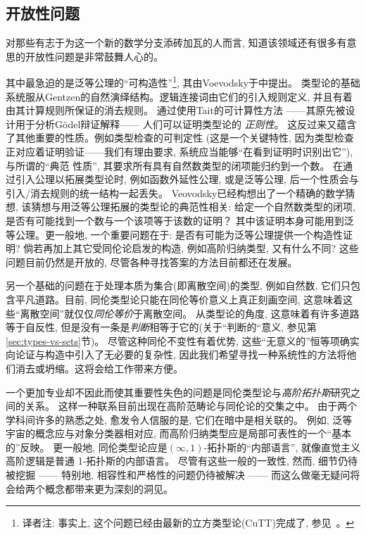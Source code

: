 %

\subsection*{开放性问题} 

%

对那些有志于为这一个新的数学分支添砖加瓦的人而言, 知道该领域还有很多有意思的开放性问题是非常鼓舞人心的。

%
其中最急迫的是泛等公理的``可构造性''\footnote{译者注: 事实上, 这个问题已经由最新的立方类型论(CuTT)完成了, 参见~\cite{cohen2016cubicaltypetheoryconstructive}。}, 
其由Voevodsky于\cite{Universe-poly}中提出。
类型论的基础系统服从Gentzen的自然演绎结构。逻辑连接词由它们的引入规则定义, 并且有着由其计算规则所保证的消去规则。
通过使用Tait的可计算性方法 ——其原先被设计用于分析G\"odel辩证解释—— 人们可以证明类型论的 \emph{正则性}。
这反过来又蕴含了其他重要的性质。例如类型检查的可判定性 
(这是一个关键特性, 因为类型检查正对应着证明验证——我们有理由要求, 系统应当能够``在看到证明时识别出它''),
与所谓的``典范 性质'', 其要求所有具有自然数类型的闭项能归约到一个数。
在通过引入公理以拓展类型论时, 例如函数外延性公理, 或是泛等公理, 后一个性质会与引入/消去规则的统一结构一起丢失。
Veovodsky已经构想出了一个精确的数学猜想, 该猜想与用泛等公理拓展的类型论的典范性相关: 给定一个自然数类型的闭项, 是否有可能找到一个数与一个该项等于该数的证明？
其中该证明本身可能用到泛等公理。更一般地, 一个重要问题在于: 是否有可能为泛等公理提供一个构造性证明? 倘若再加上其它受同伦论启发的构造, 例如高阶归纳类型, 又有什么不同?
这些问题目前仍然是开放的, 尽管各种寻找答案的方法目前都还在发展。

另一个基础的问题在于处理本质为集合(即离散空间)的类型, 例如自然数,
%
它们只包含平凡道路。目前, 同伦类型论只能在同伦等价意义上真正刻画空间,
这意味着这些``离散空间''就仅仅\emph{同伦等价}于离散空间。
从类型论的角度, 这意味着有许多道路等于自反性, 但是没有一条是\emph{判断}相等于它的(关于``判断的``意义, 参见第\ref{sec:types-vs-sets}节)。
尽管这种同伦不变性有着优势, 这些``无意义的''恒等项确实向论证与构造中引入了无必要的复杂性,
因此我们希望寻找一种系统性的方法将他们消去或坍缩。这将会给工作带来方便。

一个更加专业却不因此而使其重要性失色的问题是同伦类型论与\emph{高阶拓扑斯}研究之间的关系。
这样一种联系目前出现在高阶范畴论与同伦论的交集之中。
由于两个学科间许多的熟悉之处, 愈发令人信服的是, 它们在暗中是相关联的。
例如, 泛等宇宙的概念应与对象分类器相对应, 而高阶归纳类型应是局部可表性的一个``基本的''反映。
更一般地, 同伦类型论应是$(\infty, 1)$-拓扑斯的``内部语言'', 就像直觉主义高阶逻辑是普通 1-拓扑斯的内部语言。
尽管有这些一般的一致性, 然而, 细节仍待被挖掘 —— 特别地, 相容性和严格性的问题仍待被解决 —— 而这么做毫无疑问将会给两个概念都带来更为深刻的洞见。

